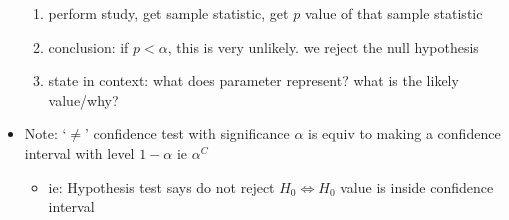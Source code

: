 \documentclass[11pt]{article}
\begin{document}
\begin{itemize}
\begin{enumerate}
    \item perform study, get sample statistic, get $p$ value of that sample statistic
    \item conclusion: if $p < \alpha$, this is very unlikely. we reject the null hypothesis
    \item state in context: what does parameter represent? what is the likely value/why?
  \end{enumerate}
  \item Note: `$\ne$' confidence test with significance $\alpha$ is equiv to making a confidence interval with level $1-\alpha$ ie $\alpha^C$
  \begin{itemize}
    \item ie: Hypothesis test says do not reject $H_0 \Leftrightarrow H_0$ value is inside confidence interval
  \end{itemize}
\end{itemize}

\end{document}
